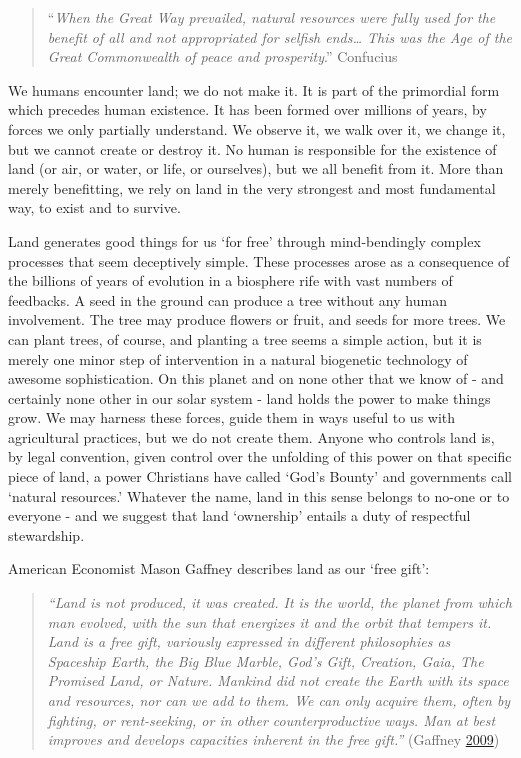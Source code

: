 \documentclass[]{tufte-handout}
\begin{document}
\begin{quote}
``\emph{When the Great Way prevailed, natural resources were fully used
for the benefit of all and not appropriated for selfish ends\ldots{}
This was the Age of the Great Commonwealth of peace and prosperity}.''
Confucius
\end{quote}

We humans encounter land; we do not make it. It is part of the
primordial form which precedes human existence. It has been formed over
millions of years, by forces we only partially understand. We observe
it, we walk over it, we change it, but we cannot create or destroy it.
No human is responsible for the existence of land (or air, or water, or
life, or ourselves), but we all benefit from it. More than merely
benefitting, we rely on land in the very strongest and most fundamental
way, to exist and to survive.

Land generates good things for us `for free' through mind-bendingly
complex processes that seem deceptively simple. These processes arose as
a consequence of the billions of years of evolution in a biosphere rife
with vast numbers of feedbacks. A seed in the ground can produce a tree
without any human involvement. The tree may produce flowers or fruit,
and seeds for more trees. We can plant trees, of course, and planting a
tree seems a simple action, but it is merely one minor step of
intervention in a natural biogenetic technology of awesome
sophistication. On this planet and on none other that we know of - and
certainly none other in our solar system - land holds the power to make
things grow. We may harness these forces, guide them in ways useful to
us with agricultural practices, but we do not create them. Anyone who
controls land is, by legal convention, given control over the unfolding
of this power on that specific piece of land, a power Christians have
called `God's Bounty' and governments call `natural resources.' Whatever
the name, land in this sense belongs to no-one or to everyone - and we
suggest that land `ownership' entails a duty of respectful stewardship.

American Economist Mason Gaffney describes land as our `free gift':

\begin{quote}
\emph{``Land is not produced, it was created. It is the world, the
planet from which man evolved, with the sun that energizes it and the
orbit that tempers it. Land is a free gift, variously expressed in
different philosophies as Spaceship Earth, the Big Blue Marble, God's
Gift, Creation, Gaia, The Promised Land, or Nature. Mankind did not
create the Earth with its space and resources, nor can we add to them.
We can only acquire them, often by fighting, or rent-seeking, or in
other counterproductive ways. Man at best improves and develops
capacities inherent in the free gift.''} (Gaffney
\protect\hyperlink{ref-Gaffney2009}{2009})
\end{quote}
\end{document}
